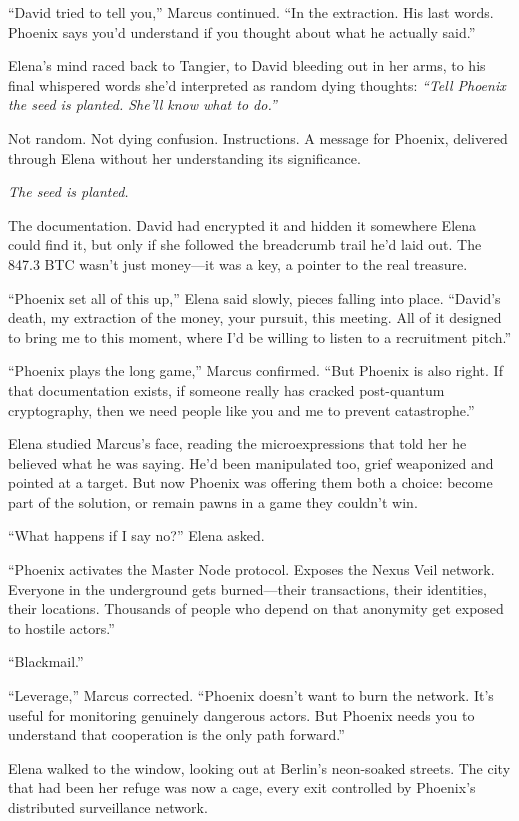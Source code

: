 ``David tried to tell you,'' Marcus continued. ``In the extraction. His last words. Phoenix says you'd understand if you thought about what he actually said.''

Elena's mind raced back to Tangier, to David bleeding out in her arms, to his final whispered words she'd interpreted as random dying thoughts: \emph{``Tell Phoenix the seed is planted. She'll know what to do.''}

Not random. Not dying confusion. Instructions. A message for Phoenix, delivered through Elena without her understanding its significance.

\emph{The seed is planted.}

The documentation. David had encrypted it and hidden it somewhere Elena could find it, but only if she followed the breadcrumb trail he'd laid out. The 847.3 BTC wasn't just money---it was a key, a pointer to the real treasure.

``Phoenix set all of this up,'' Elena said slowly, pieces falling into place. ``David's death, my extraction of the money, your pursuit, this meeting. All of it designed to bring me to this moment, where I'd be willing to listen to a recruitment pitch.''

``Phoenix plays the long game,'' Marcus confirmed. ``But Phoenix is also right. If that documentation exists, if someone really has cracked post-quantum cryptography, then we need people like you and me to prevent catastrophe.''

Elena studied Marcus's face, reading the microexpressions that told her he believed what he was saying. He'd been manipulated too, grief weaponized and pointed at a target. But now Phoenix was offering them both a choice: become part of the solution, or remain pawns in a game they couldn't win.

``What happens if I say no?'' Elena asked.

``Phoenix activates the Master Node protocol. Exposes the Nexus Veil network. Everyone in the underground gets burned---their transactions, their identities, their locations. Thousands of people who depend on that anonymity get exposed to hostile actors.''

``Blackmail.''

``Leverage,'' Marcus corrected. ``Phoenix doesn't want to burn the network. It's useful for monitoring genuinely dangerous actors. But Phoenix needs you to understand that cooperation is the only path forward.''

Elena walked to the window, looking out at Berlin's neon-soaked streets. The city that had been her refuge was now a cage, every exit controlled by Phoenix's distributed surveillance network.

